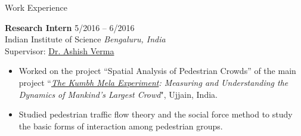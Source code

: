 \documentclass{CV} %
\begin{document}
\begin{rSection}{Work Experience}
\begin{itemize}[noitemsep]
    \end{itemize}
    {\bf Research Intern} \hfill {5/2016 – 6/2016}
    \\ Indian Institute of Science \hfill {\em Bengaluru, India}
    \\ Supervisor: \href{http://civil.iisc.ernet.in/~ashishv/}{Dr. Ashish Verma}
    \begin{itemize}[noitemsep]
        \item Worked on the project ``Spatial Analysis of Pedestrian Crowds” of the main project ``\textit{\href{http://www.the-kumbh-mela-experiment.com/}{The Kumbh Mela Experiment}: Measuring and Understanding the Dynamics of Mankind’s Largest Crowd}", Ujjain, India.
        \item Studied pedestrian traffic flow theory and the social force method to study the basic forms of interaction among pedestrian groups.
    \end{itemize}
\end{rSection}
\end{document}
